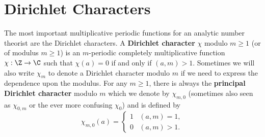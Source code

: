     \section{Dirichlet Characters}
      The most important multiplicative periodic functions for an analytic number theorist are the Dirichlet characters. A \textbf{Dirichlet character} $\chi$ modulo $m \ge 1$ (or of modulus $m \ge 1$) is an $m$-periodic completely multiplicative function $\chi:\Z \to \C$ such that $\chi(a) = 0$ if and only if $(a,m) > 1$. Sometimes we will also write $\chi_{m}$ to denote a Dirichlet character modulo $m$ if we need to express the dependence upon the modulus. For any $m \ge 1$, there is always the \textbf{principal Dirichlet character} modulo $m$ which we denote by $\chi_{m,0}$ (sometimes also seen as $\chi_{0,m}$ or the ever more confusing $\chi_{0}$) and is defined by
      \[
        \chi_{m,0}(a) = \begin{cases} 1 & (a,m) = 1, \\ 0 & (a,m) > 1. \end{cases}
      \]
